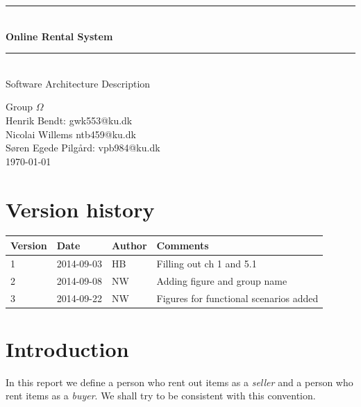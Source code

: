 \documentclass[a4paper,11pt]{report}
\makeatletter
\newcommand{\systemname}{Online Rental System}
\newcommand{\groupname}{Group $\Omega$}
\newcommand{\contactdetails}{Henrik Bendt: gwk553@ku.dk\\Nicolai Willems ntb459@ku.dk\\Søren Egede Pilgård: vpb984@ku.dk}
\makeatother
\begin{document}
%
%
\newcommand{\HRule}{\rule{\linewidth}{0.5mm}}
\begin{titlepage}

  \begin{center}

    \vspace*{4cm}
    \HRule \\[0.4cm]
    { \huge \bfseries \systemname}\\[0.4cm]
    \HRule \\[1.5cm]

    {\Large Software Architecture Description}

    \vfill
  \end{center}

  \begin{flushleft}
    {\LARGE \groupname}\\[0.2cm]
    {\large \contactdetails}\\[0.2cm]
   {\large \today}
  \end{flushleft}
\end{titlepage}

%
%
\newpage
\chapter*{Version history}

\begin{center}
  \begin{tabular}[h!]{| l | l | l | p{8 cm} |}
    \hline
    \rowcolor{gray}
    Version & Date & Author & Comments \\
    \hline
    \hline
    1 & 2014-09-03 & HB & Filling out ch 1 and 5.1\\
    \hline
    2 & 2014-09-08 & NW & Adding figure and group name \\
    \hline
    3 & 2014-09-22 & NW & Figures for functional scenarios added \\
    \hline
  \end{tabular}
\end{center}

%
%
\setcounter{tocdepth}{1}
\tableofcontents

%
%
\chapter{Introduction}
\label{cha:introduction}
\thispagestyle{fancy}

In this report we define a person who rent out items as a \textit{seller} and a
person who rent items as a \textit{buyer}. We shall try to be consistent with 
this convention.
\end{document}
